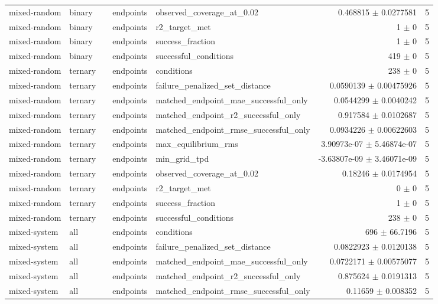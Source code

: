 \begin{tabular}{lllllrr}
mixed-random & binary &  & endpoints & observed_coverage_at_0.02 & 0.468815 $\pm$ 0.0277581 & 5 \\
mixed-random & binary &  & endpoints & r2_target_met & 1 $\pm$ 0 & 5 \\
mixed-random & binary &  & endpoints & success_fraction & 1 $\pm$ 0 & 5 \\
mixed-random & binary &  & endpoints & successful_conditions & 419 $\pm$ 0 & 5 \\
mixed-random & ternary &  & endpoints & conditions & 238 $\pm$ 0 & 5 \\
mixed-random & ternary &  & endpoints & failure_penalized_set_distance & 0.0590139 $\pm$ 0.00475926 & 5 \\
mixed-random & ternary &  & endpoints & matched_endpoint_mae_successful_only & 0.0544299 $\pm$ 0.0040242 & 5 \\
mixed-random & ternary &  & endpoints & matched_endpoint_r2_successful_only & 0.917584 $\pm$ 0.0102687 & 5 \\
mixed-random & ternary &  & endpoints & matched_endpoint_rmse_successful_only & 0.0934226 $\pm$ 0.00622603 & 5 \\
mixed-random & ternary &  & endpoints & max_equilibrium_rms & 3.90973e-07 $\pm$ 5.46874e-07 & 5 \\
mixed-random & ternary &  & endpoints & min_grid_tpd & -3.63807e-09 $\pm$ 3.46071e-09 & 5 \\
mixed-random & ternary &  & endpoints & observed_coverage_at_0.02 & 0.18246 $\pm$ 0.0174954 & 5 \\
mixed-random & ternary &  & endpoints & r2_target_met & 0 $\pm$ 0 & 5 \\
mixed-random & ternary &  & endpoints & success_fraction & 1 $\pm$ 0 & 5 \\
mixed-random & ternary &  & endpoints & successful_conditions & 238 $\pm$ 0 & 5 \\
mixed-system & all &  & endpoints & conditions & 696 $\pm$ 66.7196 & 5 \\
mixed-system & all &  & endpoints & failure_penalized_set_distance & 0.0822923 $\pm$ 0.0120138 & 5 \\
mixed-system & all &  & endpoints & matched_endpoint_mae_successful_only & 0.0722171 $\pm$ 0.00575077 & 5 \\
mixed-system & all &  & endpoints & matched_endpoint_r2_successful_only & 0.875624 $\pm$ 0.0191313 & 5 \\
mixed-system & all &  & endpoints & matched_endpoint_rmse_successful_only & 0.11659 $\pm$ 0.008352 & 5 \\

\end{tabular}
